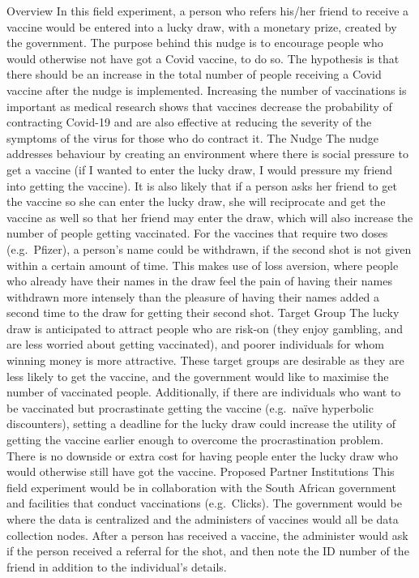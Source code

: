 \documentclass[11pt,preprint, authoryear]{elsarticle}
\numberwithin{equation}{section}
\numberwithin{figure}{section}
\numberwithin{table}{section}
\begin{document}
Overview In this field experiment, a person who refers his/her friend to
receive a vaccine would be entered into a lucky draw, with a monetary
prize, created by the government. The purpose behind this nudge is to
encourage people who would otherwise not have got a Covid vaccine, to do
so. The hypothesis is that there should be an increase in the total
number of people receiving a Covid vaccine after the nudge is
implemented. Increasing the number of vaccinations is important as
medical research shows that vaccines decrease the probability of
contracting Covid-19 and are also effective at reducing the severity of
the symptoms of the virus for those who do contract it. The Nudge The
nudge addresses behaviour by creating an environment where there is
social pressure to get a vaccine (if I wanted to enter the lucky draw, I
would pressure my friend into getting the vaccine). It is also likely
that if a person asks her friend to get the vaccine so she can enter the
lucky draw, she will reciprocate and get the vaccine as well so that her
friend may enter the draw, which will also increase the number of people
getting vaccinated. For the vaccines that require two doses
(e.g.~Pfizer), a person's name could be withdrawn, if the second shot is
not given within a certain amount of time. This makes use of loss
aversion, where people who already have their names in the draw feel the
pain of having their names withdrawn more intensely than the pleasure of
having their names added a second time to the draw for getting their
second shot. Target Group The lucky draw is anticipated to attract
people who are risk-on (they enjoy gambling, and are less worried about
getting vaccinated), and poorer individuals for whom winning money is
more attractive. These target groups are desirable as they are less
likely to get the vaccine, and the government would like to maximise the
number of vaccinated people. Additionally, if there are individuals who
want to be vaccinated but procrastinate getting the vaccine (e.g.~naïve
hyperbolic discounters), setting a deadline for the lucky draw could
increase the utility of getting the vaccine earlier enough to overcome
the procrastination problem. There is no downside or extra cost for
having people enter the lucky draw who would otherwise still have got
the vaccine. Proposed Partner Institutions This field experiment would
be in collaboration with the South African government and facilities
that conduct vaccinations (e.g.~Clicks). The government would be where
the data is centralized and the administers of vaccines would all be
data collection nodes. After a person has received a vaccine, the
administer would ask if the person received a referral for the shot, and
then note the ID number of the friend in addition to the individual's
details.
\end{document}

